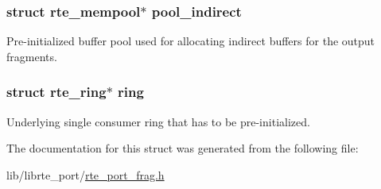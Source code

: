 \subsubsection[{pool\+\_\+indirect}]{\setlength{\rightskip}{0pt plus 5cm}struct {\bf rte\+\_\+mempool}$\ast$ pool\+\_\+indirect}\label{structrte__port__ring__reader__ipv4__frag__params_a0f5522304362b53153955b2712d7b392}
Pre-\/initialized buffer pool used for allocating indirect buffers for the output fragments. \hypertarget{structrte__port__ring__reader__ipv4__frag__params_a1dfc25cca5a340eff30700b60fd41339}{}
\subsubsection[{ring}]{\setlength{\rightskip}{0pt plus 5cm}struct {\bf rte\+\_\+ring}$\ast$ ring}\label{structrte__port__ring__reader__ipv4__frag__params_a1dfc25cca5a340eff30700b60fd41339}
Underlying single consumer ring that has to be pre-\/initialized. 

The documentation for this struct was generated from the following file\+:\begin{DoxyCompactItemize}
\item 
lib/librte\+\_\+port/\hyperlink{rte__port__frag_8h}{rte\+\_\+port\+\_\+frag.\+h}\end{DoxyCompactItemize}
